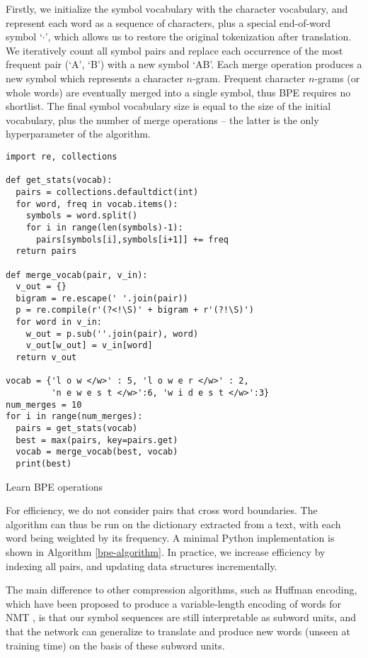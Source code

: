 \documentclass[11pt]{article}
\begin{document}
Firstly, we initialize the symbol vocabulary with the character vocabulary, and represent each word as a sequence of characters, plus a special end-of-word symbol `$\cdot$', which allows us to restore the original tokenization after translation.
We iteratively count all symbol pairs and replace each occurrence of the most frequent pair (`A', `B') with a new symbol `AB'.
Each merge operation produces a new symbol which represents a character $n$-gram.
Frequent character $n$-grams (or whole words) are eventually merged into a single symbol, thus BPE requires no shortlist.
The final symbol vocabulary size is equal to the size of the initial vocabulary, plus the number of merge operations -- the latter is the only hyperparameter of the algorithm.

\begin{algorithm}
\begin{lstlisting}
import re, collections

def get_stats(vocab):
  pairs = collections.defaultdict(int)
  for word, freq in vocab.items():
    symbols = word.split()
    for i in range(len(symbols)-1):
      pairs[symbols[i],symbols[i+1]] += freq
  return pairs

def merge_vocab(pair, v_in):
  v_out = {}
  bigram = re.escape(' '.join(pair))
  p = re.compile(r'(?<!\S)' + bigram + r'(?!\S)')
  for word in v_in:
    w_out = p.sub(''.join(pair), word)
    v_out[w_out] = v_in[word]
  return v_out

vocab = {'l o w </w>' : 5, 'l o w e r </w>' : 2,
         'n e w e s t </w>':6, 'w i d e s t </w>':3}
num_merges = 10
for i in range(num_merges):
  pairs = get_stats(vocab)
  best = max(pairs, key=pairs.get)
  vocab = merge_vocab(best, vocab)
  print(best)
\end{lstlisting}
\caption{Learn BPE operations}
\label{bpe-algorithm}
\end{algorithm}

For efficiency, we do not consider pairs that cross word boundaries.
The algorithm can thus be run on the dictionary extracted from a text, with each word being weighted by its frequency.
A minimal Python implementation is shown in Algorithm \ref{bpe-algorithm}.
In practice, we increase efficiency by indexing all pairs, and updating data structures incrementally.

The main difference to other compression algorithms, such as Huffman encoding, which have been proposed to produce a variable-length encoding of words for NMT \cite{chitnis15},
is that our symbol sequences are still interpretable as subword units, and that the network can generalize to translate and produce new words (unseen at training time) on the basis of these subword units.
\end{document}
